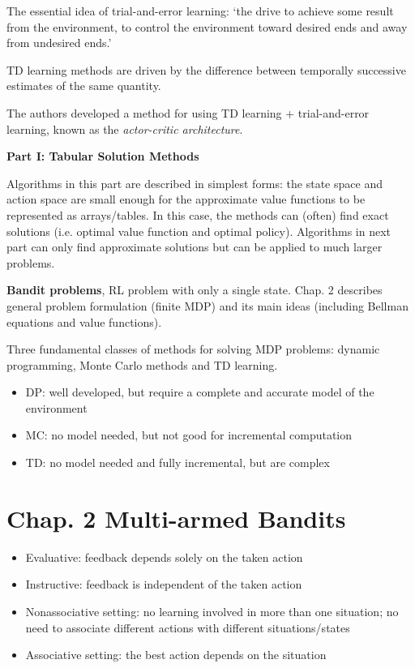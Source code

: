 \documentclass[lang=en,mode=geye,device=normal,color=blue,14pt]{elegantnote}
\DeclareMathOperator*{\1}{\mathbbm{1}}
\begin{document}
The essential idea of trial-and-error learning: `the drive to achieve some result from the environment, to control the environment toward desired ends and away from undesired ends.'

TD learning methods are driven by the difference between temporally successive estimates of the same quantity.

The authors developed a method for using TD learning + trial-and-error learning, known as the \textit{actor-critic architecture}.

\newpage
\textbf{Part I: Tabular Solution Methods}

Algorithms in this part are described in simplest forms: the state space and action space are small enough for the approximate value functions to be represented as arrays/tables.
In this case, the methods can (often) find exact solutions (i.e. optimal value function and optimal policy).
Algorithms in next part can only find approximate solutions but can be applied to much larger problems.

\textbf{Bandit problems}, RL problem with only a single state. Chap. 2 describes general problem formulation (finite MDP) and its main ideas (including Bellman equations and value functions).

Three fundamental classes of methods for solving MDP problems: dynamic programming, Monte Carlo methods and TD learning.
\begin{itemize}
\item DP: well developed, but require a complete and accurate model of the environment
\item MC: no model needed, but not good for incremental computation
\item TD: no model needed and fully incremental, but are complex
\end{itemize}

\section{Chap. 2 Multi-armed Bandits}
\begin{itemize}
\item Evaluative: feedback depends solely on the taken action
\item Instructive: feedback is independent of the taken action
\item Nonassociative setting: no learning involved in more than one situation; no need to associate different actions with different situations/states
\item Associative setting: the best action depends on the situation
\end{itemize}
\end{document}
